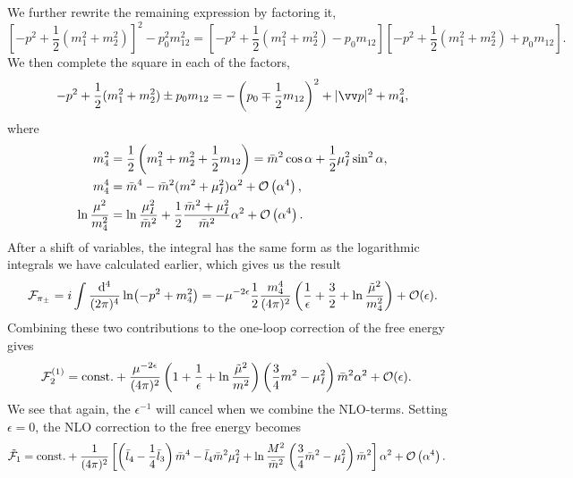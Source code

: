 We further rewrite the remaining expression by factoring it,
\begin{equation}
    \left[-p^2 + \frac{1}{2}(m_1^2 + m_2^2)\right]^2 - p_0^2 m_{12}^2
    = \left[-p^2 + \frac{1}{2}(m_1^2 + m_2^2) - p_0 m_{12} \right]
    \left[-p^2 + \frac{1}{2}(m_1^2 + m_2^2) + p_0 m_{12} \right].
\end{equation}
We then complete the square in each of the factors,
\begin{equation}
    - p^2 + \frac{1}{2}(m_1^2 + m_2^2) \pm p_0 m_{12}
    = - \left(p_0 \mp \frac{1}{2}m_{12}\right)^2 + |\vv p|^2 + m_4^2,
\end{equation}
where
\begin{align}
    m_4^2 &= \frac{1}{2}\left(m_1^2 +m_2^2 +\frac{1}{2}m_{12}\right)
    = \bar m^2 \cos\alpha + \frac{1}{2} \mu_I^2 \sin^2 \alpha, \\
    m_4^4
    &= \bar m^4 - \bar m^2(m^2 + \mu_I^2) \alpha^2 + \Oh[4]{\alpha}, \\
    \ln \frac{\mu^2}{m_4^2} 
    &= \ln \frac{\mu_I^2}{\bar m^2} + \frac{1}{2}\frac{\bar m^2 + \mu_I^2}{\bar m^2}\alpha^2
    + \Oh[4]{\alpha}.
\end{align}
After a shift of variables, the integral has the same form as the logarithmic integrals we have calculated earlier, which gives us the result
\begin{equation}
    \Ef_{\pi_\pm}
    = i \int \frac{\dd^4}{(2\pi)^4}
    \ln(-p^2 + m_4^2)
    = 
    - \mu^{-2\epsilon}\frac{1}{2} \frac{m_4^4}{(4 \pi)^2}
    \left(\frac{1}{\epsilon} + \frac{3}{2} + \ln \frac{\tilde \mu^2}{m_4^2}\right)+ \mathcal{O}(\epsilon).
\end{equation}
Combining these two contributions to the one-loop correction of the free energy gives
\begin{align*}
    \Ef_2^{(1)}
    &=
    \mathrm{const.}
    +
    \frac{\mu^{-2 \epsilon } }{(4 \pi)^2} 
    \left(1 + \frac{1}{\epsilon} + \ln \frac{\tilde \mu^2}{m^2}\right)
    \left(\frac{3}{4}m^2 - \mu_I^2\right)
    \bar m^2 \alpha^2+ \mathcal{O}(\epsilon).
\end{align*}
We see that again, the $\epsilon^{-1}$ will cancel when we combine the NLO-terms.
Setting $\epsilon = 0$, the NLO correction to the free energy becomes
\begin{align}
    \tilde \Ef_1
    & = 
    \const+ 
    \frac{1}{(4\pi)^2}
    \left[
        \left(
            \bar l_4 - \frac{1}{4}\bar l_3
        \right)\bar m^4
        -\bar l_4\bar m^2\mu_I^2
        + \ln\frac{M^2}{\bar m^2}
        \left(\frac{3}{4}\bar m^2 - \mu_I^2\right)\bar m^2
    \right]\alpha^2
    + \Oh[4]{\alpha}.
\end{align}
